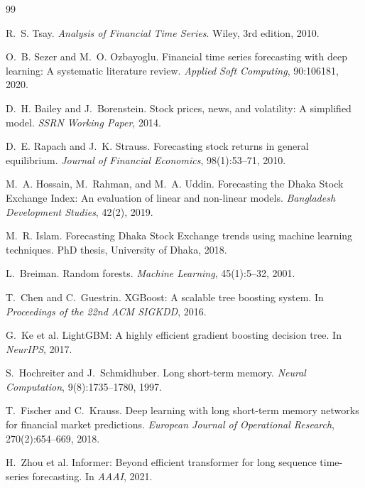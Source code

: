 \documentclass[12pt,a4paper,oneside]{report}
\begin{document}
\begin{thebibliography}{99}

R.~S. Tsay.
\newblock \emph{Analysis of Financial Time Series}.
\newblock Wiley, 3rd edition, 2010.

O.~B. Sezer and M.~O. Ozbayoglu.
\newblock Financial time series forecasting with deep learning: A
  systematic literature review.
\newblock \emph{Applied Soft Computing}, 90:106181, 2020.

D.~H. Bailey and J.~Borenstein.
\newblock Stock prices, news, and volatility: A simplified model.
\newblock \emph{SSRN Working Paper}, 2014.

D.~E. Rapach and J.~K. Strauss.
\newblock Forecasting stock returns in general equilibrium.
\newblock \emph{Journal of Financial Economics}, 98(1):53--71, 2010.

M.~A. Hossain, M.~Rahman, and M.~A. Uddin.
\newblock Forecasting the Dhaka Stock Exchange Index: An evaluation of
  linear and non-linear models.
\newblock \emph{Bangladesh Development Studies}, 42(2), 2019.

M.~R. Islam.
\newblock Forecasting Dhaka Stock Exchange trends using machine
  learning techniques.
\newblock PhD thesis, University of Dhaka, 2018.

L.~Breiman.
\newblock Random forests.
\newblock \emph{Machine Learning}, 45(1):5--32, 2001.

T.~Chen and C.~Guestrin.
\newblock XGBoost: A scalable tree boosting system.
\newblock In \emph{Proceedings of the 22nd ACM SIGKDD}, 2016.

G.~Ke et al.
\newblock LightGBM: A highly efficient gradient boosting decision tree.
\newblock In \emph{NeurIPS}, 2017.

S.~Hochreiter and J.~Schmidhuber.
\newblock Long short-term memory.
\newblock \emph{Neural Computation}, 9(8):1735--1780, 1997.

T.~Fischer and C.~Krauss.
\newblock Deep learning with long short-term memory networks for
  financial market predictions.
\newblock \emph{European Journal of Operational Research},
  270(2):654--669, 2018.

H.~Zhou et al.
\newblock Informer: Beyond efficient transformer for long sequence
  time-series forecasting.
\newblock In \emph{AAAI}, 2021.


\end{thebibliography}
\end{document}
